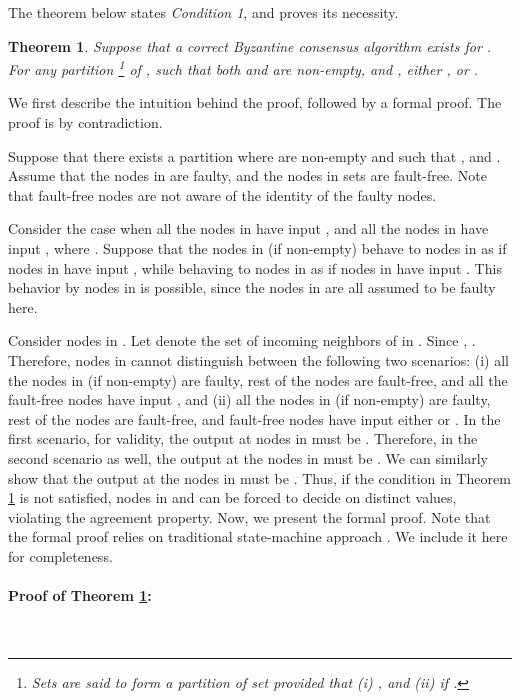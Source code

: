 \documentclass[letterpaper, 11pt]{article}
\newtheorem{theorem}{Theorem}
\begin{document}
The theorem below states {\em Condition 1}, and proves its necessity. 

\begin{theorem}
\label{t_nec_1}
Suppose that a correct Byzantine consensus algorithm exists for .
For any partition
\footnote{Sets  are said to form a partition of set  provided that (i) , and (ii)  if .}
  of , such that
both  and  are non-empty, and , either , 
or .
\end{theorem}

We first describe the intuition behind the proof, followed by a formal proof. The proof is by contradiction.

Suppose that there exists a partition  where  are non-empty and  such that
, and . Assume that the nodes in  are faulty, and the nodes in sets  are fault-free. Note that fault-free nodes are not aware of the identity of the faulty nodes.


Consider the case when all the nodes in  have input , and all the nodes in  have input , where . Suppose that the nodes in  (if non-empty) behave to nodes in  as if nodes in  have input , while behaving to nodes in  as if nodes in  have input . This behavior by nodes in  is possible, since the nodes in  are all assumed to be faulty here. 

Consider nodes in .
Let  denote the set of incoming neighbors of  in .
Since , .
Therefore, nodes in  cannot distinguish between the following two scenarios:
 (i) all the nodes in  (if non-empty) are faulty, rest of the nodes are fault-free,  and all the fault-free nodes have input , and (ii) all the nodes in  (if non-empty) are faulty, rest of the nodes are fault-free, and fault-free nodes have input either  or . In the first scenario, for validity, the output at nodes in  must be . Therefore, in the second scenario as well, the output at the nodes in  must be . We can similarly show that the output at the nodes in  must be . Thus, if the condition in Theorem \ref{t_nec_1} is not satisfied, nodes in  and  can be forced to decide on distinct values, violating the agreement property. Now, we present the formal proof. Note that the formal proof relies on traditional state-machine approach \cite{impossible_proof_lynch, welch_book}. We include it here for completeness.


\paragraph{Proof of Theorem \ref{t_nec_1}:}
~\\
\end{document}

